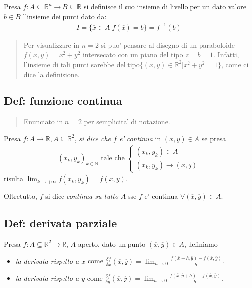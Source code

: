 \documentclass{article}
\begin{document}
Presa $f: A \subseteq \mathbb{R}^n \to B \subseteq \mathbb{R}$ si definisce il suo insieme
di livello per un dato valore $b \in B$ l'insieme dei punti dato da:
\begin{align*}
  I = \{ \overline{x} \in A | f(\overline{x}) = b \} = f^{-1}(b)
\end{align*}

\begin{quote}
  Per visualizzare in $n=2$ si puo' pensare al disegno di un paraboloide $f(x,y) = x^2 + y^2$
  intersecato con un piano del tipo $z = b = 1$. Infatti, l'insieme di tali punti sarebbe del
  tipo$\{(x,y) \in \mathbb{R}^2 | x^2 + y^2 = 1\}$, come ci dice la definizione.
\end{quote}

\subsection{Def: funzione continua}

\begin{quote}
  Enunciato in $n = 2$ per semplicita' di notazione.
\end{quote}

\noindent Presa $f: A \to \mathbb{R}, A \subseteq \mathbb{R}^2$, \emph{si dice
che $f$ e' continua} in $(\overline{x}, \overline{y}) \in A$ se presa 
\begin{align*}
  (x_k, y_k)_{k \in \mathbb{N}} \text{ tale che } \begin{cases}
    (x_k, y_k) \in A \\
    (x_k, y_k) \to (\overline{x}, \overline{y})
  \end{cases}
\end{align*}
risulta $\lim_{k \to +\infty} f(x_k, y_k) = f(\overline{x}, \overline{y})$.

Oltretutto, $f$ si dice \emph{continua su tutto} $A$ sse $f$ e' continua
$\forall (\overline{x}, \overline{y}) \in A$.

\subsection{Def: derivata parziale}

Presa $f: A \subseteq \mathbb{R}^2 \to \mathbb{R}$, $A$ aperto, dato un punto
$(\overline{x}, \overline{y}) \in A$, definiamo

\begin{itemize}
  \item \emph{la derivata rispetto a $x$} come $\frac{\delta f}{\delta x}(\overline{x},
    \overline{y}) = \lim_{h \to 0} \frac{f(\overline{x}+h, \overline{y}) -
    f(\overline{x}, \overline{y})}{h}$.

  \item \emph{la derivata rispetto a $y$} come $\frac{\delta f}{\delta y}(\overline{x},
    \overline{y}) = \lim_{h \to 0} \frac{f(\overline{x}, \overline{y} + h) -
    f(\overline{x}, \overline{y})}{h}$.
\end{itemize}
\end{document}
